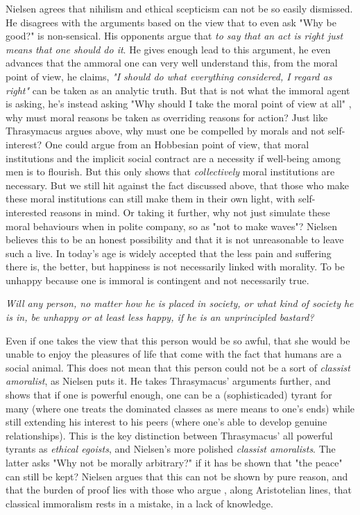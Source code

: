 \documentclass[english,course]{Notes}
\newcommand{\ita}[1]{\textit{#1}}
\newcommand\quo[1]{\begin{displayquote}\ita{\large{#1}}\end{displayquote}}
\begin{document}
\par{Nielsen agrees that nihilism and ethical scepticism can not be so easily dismissed. He disagrees with the arguments based on the view that to even ask "Why be good?" is non-sensical. His opponents argue that \ita{to say that an act is right just means that one should do it}. He gives enough lead to this argument, he even advances that the ammoral one can very well understand this, from the moral point of view, he claims, \ita{"I should do what everything considered, I regard as right"} can be taken as an analytic truth. But that is not what the immoral agent is asking, he's instead asking "Why should I take the moral point of view at all" , why must moral reasons be taken as overriding reasons for action? Just like Thrasymacus argues above, why must one be compelled by morals and not self-interest? One could argue from an Hobbesian point of view, that moral institutions and the implicit social contract are a necessity if well-being among men is to flourish.   But this only shows that \ita{collectively} moral institutions are necessary. But we still hit against the fact discussed above, that those who make these moral institutions can still make them in their own light, with self-interested reasons in mind. Or taking it further, why not just simulate these moral behaviours when in polite company, so as "not to make waves"? Nielsen believes this to be an honest possibility and that it is not unreasonable to leave such a live. In today's age is widely accepted that the less pain and suffering there is, the better, but happiness is not necessarily linked with morality. To be unhappy because one is immoral is contingent and not necessarily true.}

\quo{Will any person, no matter how he is placed in society, or what kind of society he is in, be unhappy or at least less happy, if he is an unprincipled bastard?}

Even if one takes the view that this person would be so awful, that she would be unable to enjoy the pleasures of life that come with the fact that humans are a social animal. This does not mean that this person could not be a sort of \ita{classist amoralist}, as Nielsen puts it. He takes Thrasymacus' arguments further, and shows that if one is powerful enough, one can be a (sophisticaded) tyrant for many (where one treats the dominated classes as mere means to one's ends) while still extending his interest to his peers (where one's able to develop genuine relationships). This is the key distinction between Thrasymacus' all powerful tyrants as \ita{ethical egoists}, and Nielsen's more polished \ita{classist amoralists}. The latter asks "Why not be morally arbitrary?" if it has be shown that "the peace" can still be kept? Nielsen argues that this can not be shown by pure reason, and that the burden of proof lies with those who argue , along Aristotelian lines, that classical immoralism rests in a mistake, in a lack of knowledge.
\end{document}
